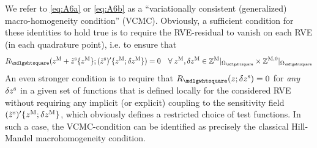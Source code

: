 \documentclass[12pt,a4paper]{article}
\renewcommand{\Box}{\mdlgwhtsquare}
\begin{document}
We refer to \eqref{eq:A6a} or \eqref{eq:A6b} as a ``variationally consistent (generalized) macro-homogeneity condition'' (VCMC).
Obviously, a sufficient condition for these identities to hold true is to require the RVE-residual to vanish on each RVE (in each quadrature point), i.e. to ensure that
\begin{align}
\label{eq:A8} R_\Box(z^\macro + \tilde z^\fluct\{z^\macro\};(\tilde{z}^\fluct)'\{z^\macro;\delta z^\macro\}) = 0\quad \forall\;z^\macro,\delta z^\macro\in\set Z^{\macro}|_{\Omega_\Box}\times\set Z^{\macro,0}|_{\Omega_\Box}
\end{align}
An even stronger condition is to require that $R_\Box(z;\delta z^\fluct) = 0$ for \emph{any} $\delta z^{\mathrm{s}}$ in a given set of functions that is defined locally for the considered RVE without requiring any implicit (or explicit) coupling to the sensitivity field $(\tilde{z}^{\mathrm{s}})'\{z^{\mathrm{M}};\delta z^{\mathrm{M}}\}$, which obviously defines a restricted choice of test functions.
In such a case, the VCMC-condition can be identified as precisely the classical Hill-Mandel macrohomogeneity condition.
\end{document}
